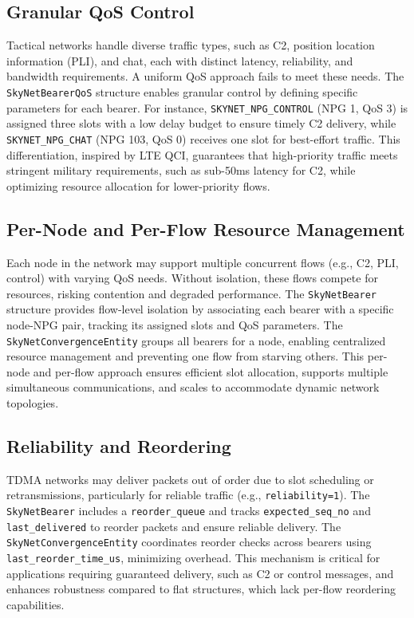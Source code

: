 \documentclass{article}
\begin{document}
\subsection{Granular QoS Control}
Tactical networks handle diverse traffic types, such as C2, position location information (PLI), and
chat, each with distinct latency, reliability, and bandwidth requirements. A uniform QoS approach
fails to meet these needs. The \texttt{SkyNetBearerQoS} structure enables granular control by
defining specific parameters for each bearer. For instance, \texttt{SKYNET\_NPG\_CONTROL} (NPG 1,
QoS 3) is assigned three slots with a low delay budget to ensure timely C2 delivery, while
\texttt{SKYNET\_NPG\_CHAT} (NPG 103, QoS 0) receives one slot for best-effort traffic. This
differentiation, inspired by LTE QCI, guarantees that high-priority traffic meets stringent military
requirements, such as sub-50ms latency for C2, while optimizing resource allocation for
lower-priority flows.

\subsection{Per-Node and Per-Flow Resource Management}
Each node in the network may support multiple concurrent flows (e.g., C2, PLI, control) with varying
QoS needs. Without isolation, these flows compete for resources, risking contention and degraded
performance. The \texttt{SkyNetBearer} structure provides flow-level isolation by associating each
bearer with a specific node-NPG pair, tracking its assigned slots and QoS parameters. The
\texttt{SkyNetConvergenceEntity} groups all bearers for a node, enabling centralized resource
management and preventing one flow from starving others. This per-node and per-flow approach ensures
efficient slot allocation, supports multiple simultaneous communications, and scales to accommodate
dynamic network topologies.

\subsection{Reliability and Reordering}
TDMA networks may deliver packets out of order due to slot scheduling or retransmissions,
particularly for reliable traffic (e.g., \texttt{reliability=1}). The \texttt{SkyNetBearer} includes
a \texttt{reorder\_queue} and tracks \texttt{expected\_seq\_no} and \texttt{last\_delivered} to
reorder packets and ensure reliable delivery. The \texttt{SkyNetConvergenceEntity} coordinates
reorder checks across bearers using \texttt{last\_reorder\_time\_us}, minimizing overhead. This
mechanism is critical for applications requiring guaranteed delivery, such as C2 or control
messages, and enhances robustness compared to flat structures, which lack per-flow reordering
capabilities.
\end{document}
